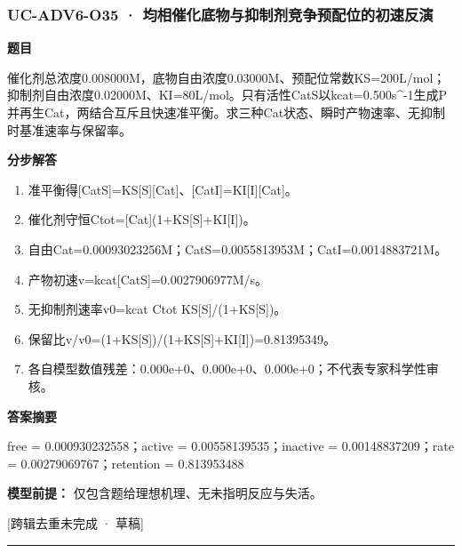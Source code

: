 \documentclass[UTF8,11pt,a4paper]{ctexart}
\begin{document}
\subsubsection*{UC-ADV6-O35 · 均相催化底物与抑制剂竞争预配位的初速反演}
\noindent\textbf{题目}\par
催化剂总浓度0.008000M，底物自由浓度0.03000M、预配位常数KS=200L/mol；抑制剂自由浓度0.02000M、KI=80L/mol。只有活性CatS以kcat=0.500s\textasciicircum{}-1生成P并再生Cat，两结合互斥且快速准平衡。求三种Cat状态、瞬时产物速率、无抑制时基准速率与保留率。\par
\medskip\noindent\textbf{分步解答}
\begin{enumerate}
\item 准平衡得[CatS]=KS[S][Cat]、[CatI]=KI[I][Cat]。
\item 催化剂守恒Ctot=[Cat](1+KS[S]+KI[I])。
\item 自由Cat=0.00093023256M；CatS=0.0055813953M；CatI=0.0014883721M。
\item 产物初速v=kcat[CatS]=0.0027906977M/s。
\item 无抑制剂速率v0=kcat Ctot KS[S]/(1+KS[S])。
\item 保留比v/v0=(1+KS[S])/(1+KS[S]+KI[I])=0.81395349。
\item 各自模型数值残差：0.000e+0、0.000e+0、0.000e+0；不代表专家科学性审核。
\end{enumerate}
\noindent\textbf{答案摘要}\par
free = 0.000930232558；active = 0.00558139535；inactive = 0.00148837209；rate = 0.00279069767；retention = 0.813953488\par
\noindent\textbf{模型前提：}
仅包含题给理想机理、无未指明反应与失活。\par
\noindent\textcolor{red!65!black}{[跨辑去重未完成 · 草稿]} \par
\medskip\hrule\medskip
{}
\end{document}

